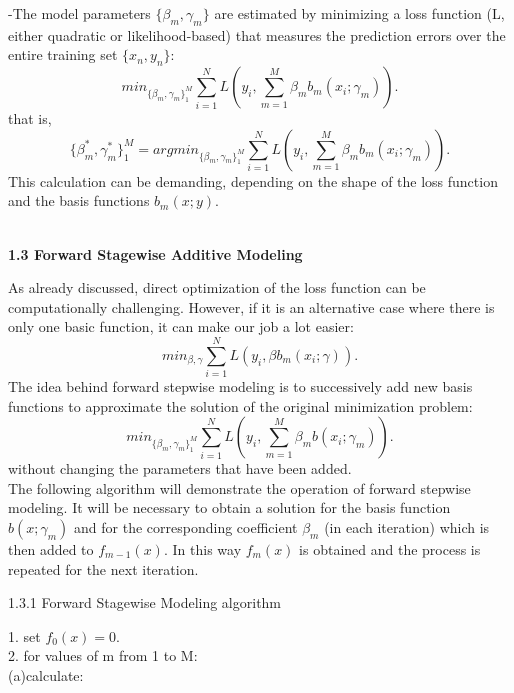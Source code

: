 \documentclass[12pt, letterpaper, twoside]{article}
\begin{document}
-The model parameters $\{\beta_m,\gamma_m\}$ are estimated by minimizing a loss function (L, either quadratic or likelihood-based) that measures the prediction errors over the entire training set $\{x_n,y_n\}$:
\begin{equation*}
min_{\{\beta_m,\gamma_m\}_1^M} \sum_{i=1}^N L(y_i, \sum_{m=1}^M \beta_m b_m(x_i;\gamma_m)).
\end{equation*}
that is,
\begin{equation*}
\{\beta_m^*,\gamma_m^*\}_1^M=argmin_{\{\beta_m,\gamma_m\}_1^M}\sum_{i=1}^N L(y_i, \sum_{m=1}^M \beta_m b_m(x_i;\gamma_m)).
\end{equation*}
This calculation can be demanding, depending on the shape of the loss function and the basis functions $b_m(x;y)$.
\begin{center}
\textbf{\large{\\1.3 Forward Stagewise Additive Modeling}\\}
\end{center}
As already discussed, direct optimization of the loss function can be computationally challenging. However, if it is an alternative case where there is only one basic function, it can make our job a lot easier:
\begin{equation*}
min_{\beta,\gamma}\sum_{i=1}^N L(y_i,\beta b_m(x_i;\gamma)).
\end{equation*}
The idea behind forward stepwise modeling is to successively add new basis functions to approximate the solution of the original minimization problem:
\begin{equation*}
min_{\{\beta_m,\gamma_m\}_1^M} \sum_{i=1}^N L(y_i, \sum_{m=1}^M \beta_m b(x_i;\gamma_m)).
\end{equation*}
without changing the parameters that have been added.\\
The following algorithm will demonstrate the operation of forward stepwise modeling. It will be necessary to obtain a solution for the basis function $b(x;\gamma_m)$ and for the corresponding coefficient $\beta_m$ (in each iteration) which is then added to $f_{m-1}(x)$. In this way $f_m(x)$ is obtained and the process is repeated for the next iteration.\\
\begin{center}
\large{1.3.1 Forward Stagewise Modeling algorithm}\\
\end{center}
1. set $f_0(x)=0$.\\
2. for values of m from 1 to M:\\
\hspace*{6ex}(a)\space calculate:
\end{document}
